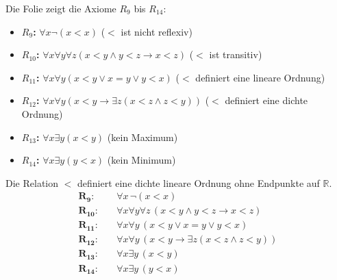 \begin{meta-note}
Die Folie zeigt die Axiome $R_9$ bis $R_{14}$:
\begin{itemize}
    \item \textbf{$R_9$:} $\forall x \neg (x < x)$ ($<$ ist nicht reflexiv)
    \item \textbf{$R_{10}$:} $\forall x \forall y \forall z (x < y \land y < z \to x < z)$ ($<$ ist transitiv)
    \item \textbf{$R_{11}$:} $\forall x \forall y (x < y \lor x = y \lor y < x)$ ($<$ definiert eine lineare Ordnung)
    \item \textbf{$R_{12}$:} $\forall x \forall y (x < y \to \exists z (x < z \land z < y))$ ($<$ definiert eine dichte Ordnung)
    \item \textbf{$R_{13}$:} $\forall x \exists y (x < y)$ (kein Maximum)
    \item \textbf{$R_{14}$:} $\forall x \exists y (y < x)$ (kein Minimum)
\end{itemize}
\end{meta-note}

\begin{math-stroke}
Die Relation $<$ definiert eine dichte lineare Ordnung ohne Endpunkte auf $\mathbb{R}$.
\begin{align}
    \mathbf{R_9}\colon &\quad \forall x \, \neg (x < x) \label{eq:R9} \\
    \mathbf{R_{10}}\colon &\quad \forall x \forall y \forall z \, (x < y \land y < z \to x < z) \label{eq:R10} \\
    \mathbf{R_{11}}\colon &\quad \forall x \forall y \, (x < y \lor x = y \lor y < x) \label{eq:R11} \\
    \mathbf{R_{12}}\colon &\quad \forall x \forall y \, (x < y \to \exists z (x < z \land z < y)) \label{eq:R12} \\
    \mathbf{R_{13}}\colon &\quad \forall x \exists y \, (x < y) \label{eq:R13} \\
    \mathbf{R_{14}}\colon &\quad \forall x \exists y \, (y < x) \label{eq:R14}
\end{align}
\end{math-stroke}

